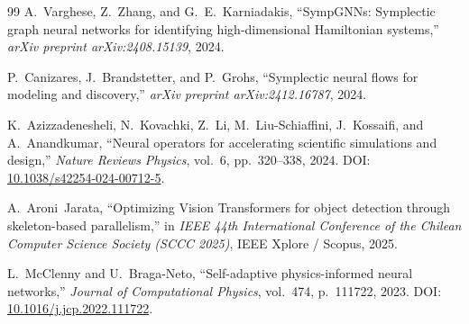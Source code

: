 \documentclass[11pt,a4paper]{article}
\begin{document}
\begin{thebibliography}{99}
A.~Varghese, Z.~Zhang, and G.~E.~Karniadakis, ``SympGNNs: Symplectic graph neural networks for identifying high-dimensional Hamiltonian systems,'' \emph{arXiv preprint arXiv:2408.15139}, 2024.

P.~Canizares, J.~Brandstetter, and P.~Grohs, ``Symplectic neural flows for modeling and discovery,'' \emph{arXiv preprint arXiv:2412.16787}, 2024.

K.~Azizzadenesheli, N.~Kovachki, Z.~Li, M.~Liu-Schiaffini, J.~Kossaifi, and A.~Anandkumar, ``Neural operators for accelerating scientific simulations and design,'' \emph{Nature Reviews Physics}, vol.~6, pp.~320--338, 2024. DOI: \href{https://doi.org/10.1038/s42254-024-00712-5}{10.1038/s42254-024-00712-5}.

A.~Aroni~Jarata, ``Optimizing Vision Transformers for object detection through skeleton-based parallelism,'' in \emph{IEEE 44th International Conference of the Chilean Computer Science Society (SCCC 2025)}, IEEE Xplore / Scopus, 2025.

L.~McClenny and U.~Braga-Neto, ``Self-adaptive physics-informed neural networks,'' \emph{Journal of Computational Physics}, vol.~474, p.~111722, 2023. DOI: \href{https://doi.org/10.1016/j.jcp.2022.111722}{10.1016/j.jcp.2022.111722}.

\end{thebibliography}
\end{document}
